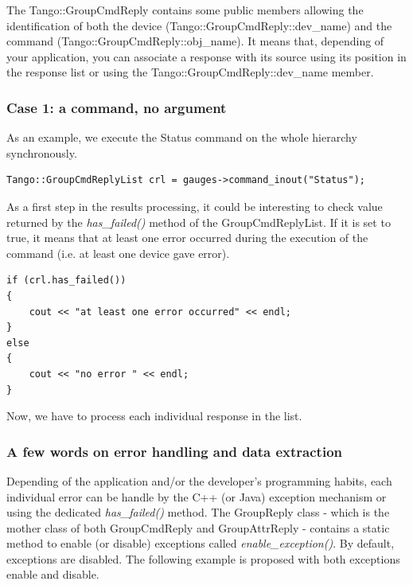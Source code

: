 The Tango::GroupCmdReply contains some public members allowing the
identification of both the device (Tango::GroupCmdReply::dev\_name)
and the command (Tango::GroupCmdReply::obj\_name).
It means that, depending of your application, you can associate a
response with its source using its position in the response list or
using the Tango::GroupCmdReply::dev\_name member.


\subsubsection{Case 1: a command, no argument}
\label{sub:Case-1}

As an example, we execute the Status command on the whole hierarchy
synchronously.
\begin{verbatim}
Tango::GroupCmdReplyList crl = gauges->command_inout("Status");
\end{verbatim}
As a first step in the results processing, it could be interesting
to check value returned by the \emph{has\_failed()}
method of the GroupCmdReplyList. If it is
set to true, it means that at least one error occurred during the
execution of the command (i.e. at least one device gave error).


\begin{verbatim}
if (crl.has_failed())
{
    cout << "at least one error occurred" << endl;
}
else
{
    cout << "no error " << endl;
}
\end{verbatim}


Now, we have to process each \textquotedbl{}individual response\textquotedbl{}
in the list. 


\subsubsection{A few words on error handling and data extraction}

Depending of the application and/or the developer's programming habits,
each individual error can be handle by the C++ (or Java) exception
mechanism or using the dedicated \emph{has\_failed()}
method. The GroupReply class - which is the mother
class of both GroupCmdReply and GroupAttrReply
- contains a static method to enable (or disable) exceptions called
\emph{enable\_exception()}. By default,
exceptions are disabled. The following example is proposed with both
exceptions enable and disable. 

